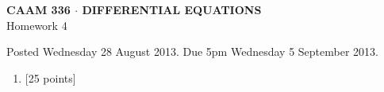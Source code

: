 \documentclass[10pt]{article}
\begin{document}
\vspace*{-5em}
\begin{center}
\large \textsf{\textbf{CAAM 336 $\cdot$ DIFFERENTIAL EQUATIONS}\\[0.5em]
Homework 4 }
\end{center}

Posted Wednesday 28 August 2013.  Due 5pm Wednesday 5 September 2013.

\begin{enumerate}\addtocounter{enumi}{3}
\item {[25 points]} \\ 
\end{enumerate}
\end{document}
